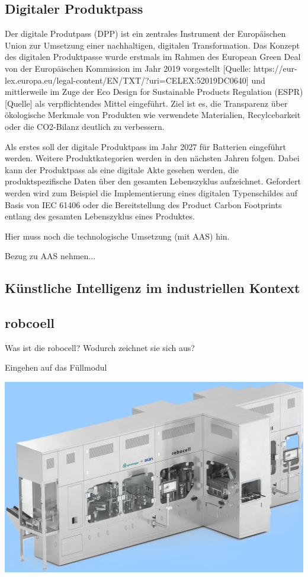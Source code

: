 \subsection{Digitaler Produktpass}
Der digitale Produtpass (DPP) ist ein zentrales Instrument der Europäischen Union zur Umsetzung einer nachhaltigen, digitalen Transformation.
Das Konzept des digitalen Produktpasse wurde erstmals im Rahmen des European Green Deal von der Europäischen Kommission im Jahr 2019 vorgestellt [Quelle: https://eur-lex.europa.eu/legal-content/EN/TXT/?uri=CELEX:52019DC0640] und mittlerweile im Zuge der Eco Design for Sustainable Products Regulation (ESPR) [Quelle] als verpflichtendes Mittel eingeführt.
Ziel ist es, die Transparenz über ökologische Merkmale von Produkten wie verwendete Materialien, Recylcebarkeit oder die CO2-Bilanz deutlich zu verbessern.

Als erstes soll der digitale Produktpass im Jahr 2027 für Batterien eingeführt werden. Weitere Produktkategorien werden in den nächsten Jahren folgen.
Dabei kann der Produktpass als eine digitale Akte gesehen werden, die produktspezifische Daten über den gesamten Lebenszyklus aufzeichnet.
Gefordert werden wird zum Beispiel die Implementierung eines digitalen Typenschildes auf Basis von IEC 61406 oder die Bereitstellung des Product Carbon Footprints entlang des gesamten Lebenszyklus eines Produktes.



Hier muss noch die technologische Umsetzung (mit AAS) hin.


Bezug zu AAS nehmen...
\subsection{Künstliche Intelligenz im industriellen Kontext}



\subsection{robcoell}
Was ist die robocell? Wodurch zeichnet sie sich aus?

Eingehen auf das Füllmodul


\includegraphics{Bilder/robocell_FS2_rgb_Logo.png}
